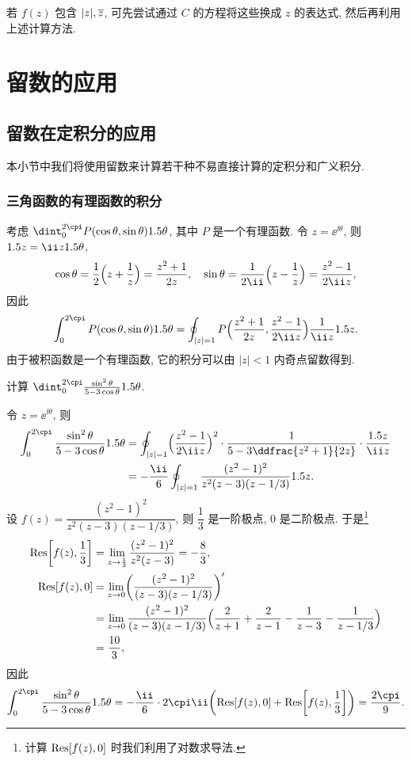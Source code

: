 若 $f(z)$ 包含 $|z|,\overline z$, 可先尝试通过 $C$ 的方程将这些换成 $z$ 的表达式, 然后再利用上述计算方法.



\section{留数的应用}

\subsection{留数在定积分的应用}

本小节中我们将使用留数来计算若干种不易直接计算的定积分和广义积分.

\subsubsection{三角函数的有理函数的积分}

考虑 $\dint_0^{2\cpi} P(\cos\theta,\sin\theta)\d\theta$, 其中 $P$ 是一个有理函数.
令 $z=\ee^{\ii \theta}$, 则 $\d z=\ii z\d\theta$,
\[
   \cos\theta
  =\half\Bigl(z+\frac1z\Bigr)
  =\frac{z^2+1}{2z},\quad
  \sin\theta
  =\frac1{2\ii}\Bigl(z-\frac1z\Bigr)
  =\frac{z^2-1}{2\ii z},
\]
因此
\[
   \int_0^{2\cpi} P(\cos\theta,\sin\theta)\d\theta
  =\oint_{|z|=1} P\Bigl(\frac{z^2+1}{2z},\frac{z^2-1}{2\ii z}\Bigr)\frac1{\ii z}\d z.
\]
由于被积函数是一个有理函数, 它的积分可以由 $|z|<1$ 内奇点留数得到.

\begin{example}
  计算 $\dint_0^{2\cpi}\frac{\sin^2\theta}{5-3\cos\theta}\d\theta$.
\end{example}

\begin{solution}
  令 $z=\ee^{\ii \theta}$, 则
  \begin{align*}
     \int_0^{2\cpi}\frac{\sin^2\theta}{5-3\cos\theta}\d\theta&
    =\oint_{|z|=1}\Bigl(\frac{z^2-1}{2\ii z}\Bigr)^2\cdot
      \frac1{5-3\ddfrac{z^2+1}{2z}}\cdot\frac{\d z}{\ii z}\\&
    =-\frac\ii6\oint_{|z|=1}\frac{(z^2-1)^2}{z^2(z-3)(z-1/3)}\d z.
  \end{align*}
  设 $f(z)=\dfrac{(z^2-1)^2}{z^2(z-3)(z-1/3)}$, 则 $\dfrac13$ 是一阶极点, $0$ 是二阶极点.
  于是\footnote{
    计算 ${\mathrm{Res}}[f(z),0]$ 时我们利用了对数求导法.
  }
  \begin{align*}
     {\mathrm{Res}}\biggl[f(z),\frac13\biggr]&
    =\lim_{z\rightarrow \frac13}\frac{(z^2-1)^2}{z^2(z-3)}
    =-\frac83,\\
     {\mathrm{Res}}[f(z),0]&
    =\lim_{z\rightarrow 0}\biggl(\frac{(z^2-1)^2}{(z-3)(z-1/3)}\biggr)'\\&
    =\lim_{z\rightarrow 0}\frac{(z^2-1)^2}{(z-3)(z-1/3)}
      \Bigl(\frac2{z+1}+\frac2{z-1}-\frac1{z-3}-\frac1{z-1/3}\Bigr)\\&
    =\frac{10}3,
  \end{align*}
  因此
  \[
     \int_0^{2\cpi}\frac{\sin^2\theta}{5-3\cos\theta}\d\theta
    =-\frac\ii6\cdot 2\cpi\ii\biggl(\Res[f(z),0]+\Res\biggl[f(z),\frac13\biggr]\biggr)
    =\frac{2\cpi}9.
  \]
\end{solution}



